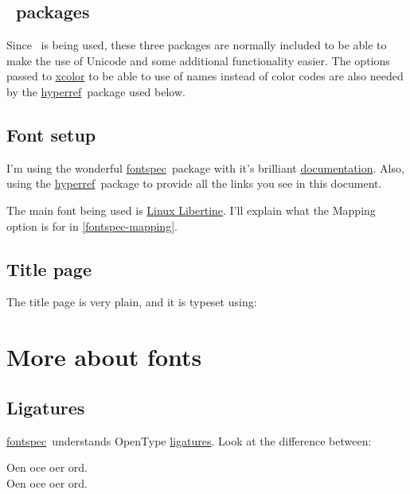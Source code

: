 \documentclass[a4paper,extrafontsizes,12pt,twoside,openany]{memoir}
\newcommand{\showpart}[1]{\noindent}
\newcommand{\HyperRef}{\href{http://www.tug.org/applications/hyperref/manual.html}{hyperref}\ }
\newcommand{\FontSpec}{\href{http://tug.ctan.org/cgi-bin/ctanPackageInformation.py?id=fontspec}{fontspec}\ }
\newcommand{\red}[1]{{\color{red}{#1}}}
\begin{document}
\showpart{PARAGRAPHSTYLES}

\section{\XeTeX\ packages}

Since \XeTeX\ is being used, these three packages are normally included to be able to make the use of Unicode and some additional
functionality easier. The options passed to \href{http://www.ukern.de/tex/xcolor.html}{xcolor} to be able to use of names
instead of color codes are also needed by the \HyperRef package used below.

\showpart{XETEXPACKAGES}

\section{Font setup}

I'm using the wonderful \FontSpec package with
it's brilliant \href{http://tug.ctan.org/tex-archive/macros/xetex/latex/fontspec/fontspec.pdf}{documentation}. Also,
using the \HyperRef package to provide all the links you see in this document.

The main font being used is \href{http://linuxlibertine.sourceforge.net/}{Linux Libertine}. I'll explain what the
Mapping option is for in \autoref{fontspec-mapping}.

\showpart{OTHERPACKAGES}

\section{Title page}

The title page is very plain, and it is typeset using: \showpart{TITLE}

\chapter{More about fonts}

\section{Ligatures}

\FontSpec understands OpenType \href{http://en.wikipedia.org/wiki/Typographic\_ligature}{ligatures}. Look at the
difference between:

{\newcommand{\ligs}{O\red{ft}en o\red{ffi}ce o\red{ff}er \red{fj}ord.}
{\Huge { \ligs}} \\
{\Huge { \ligs}}}
\end{document}
